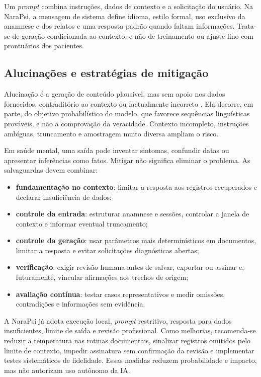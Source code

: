 Um \textit{prompt} combina instruções, dados de contexto e a solicitação do usuário. Na NaraPsi, a mensagem de sistema define idioma, estilo formal, uso exclusivo da anamnese e dos relatos e uma resposta padrão quando faltam informações. Trata-se de geração condicionada ao contexto, e não de treinamento ou ajuste fino com prontuários dos pacientes.

\subsection{Alucinações e estratégias de mitigação}

Alucinação é a geração de conteúdo plausível, mas sem apoio nos dados fornecidos, contraditório ao contexto ou factualmente incorreto \cite{ji2023survey}. Ela decorre, em parte, do objetivo probabilístico do modelo, que favorece sequências linguísticas prováveis, e não a comprovação da veracidade. Contexto incompleto, instruções ambíguas, truncamento e amostragem muito diversa ampliam o risco.

Em saúde mental, uma saída pode inventar sintomas, confundir datas ou apresentar inferências como fatos. Mitigar não significa eliminar o problema. As salvaguardas devem combinar:

\begin{itemize}
    \item \textbf{fundamentação no contexto}: limitar a resposta aos registros recuperados e declarar insuficiência de dados;
    \item \textbf{controle da entrada}: estruturar anamnese e sessões, controlar a janela de contexto e informar eventual truncamento;
    \item \textbf{controle da geração}: usar parâmetros mais determinísticos em documentos, limitar a resposta e evitar solicitações diagnósticas abertas;
    \item \textbf{verificação}: exigir revisão humana antes de salvar, exportar ou assinar e, futuramente, vincular afirmações aos trechos de origem;
    \item \textbf{avaliação contínua}: testar casos representativos e medir omissões, contradições e informações sem evidência.
\end{itemize}

A NaraPsi já adota execução local, \textit{prompt} restritivo, resposta para dados insuficientes, limite de saída e revisão profissional. Como melhorias, recomenda-se reduzir a temperatura nas rotinas documentais, sinalizar registros omitidos pelo limite de contexto, impedir assinatura sem confirmação da revisão e implementar testes sistemáticos de fidelidade. Essas medidas reduzem probabilidade e impacto, mas não autorizam uso autônomo da IA.


